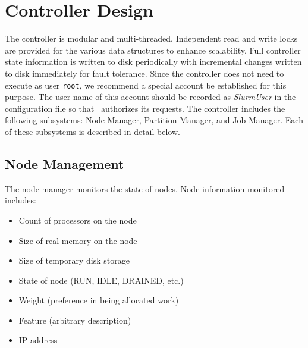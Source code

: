 \section{Controller Design}

The controller is modular and multi-threaded.  Independent read
and write locks are provided for the various data structures to enhance 
scalability.  Full controller state information is written to 
disk periodically with incremental changes written to disk immediately
for fault tolerance.  
Since the controller does not need to execute as user {\tt root}, 
we recommend a special account be established for this purpose.
The user name of this account should be recorded as {\em SlurmUser} 
in the configuration file so that \slurmd\ authorizes its requests.
The controller includes the following subsystems:
Node Manager, Partition Manager, and Job Manager.
Each of these subsystems is described in detail below.

\subsection{Node Management}

The node manager monitors the state of nodes.  
Node information monitored includes:

\begin{itemize}
\item Count of processors on the node
\item Size of real memory on the node
\item Size of temporary disk storage
\item State of node (RUN, IDLE, DRAINED, etc.)
\item Weight (preference in being allocated work)
\item Feature (arbitrary description)
\item IP address
\end{itemize}

